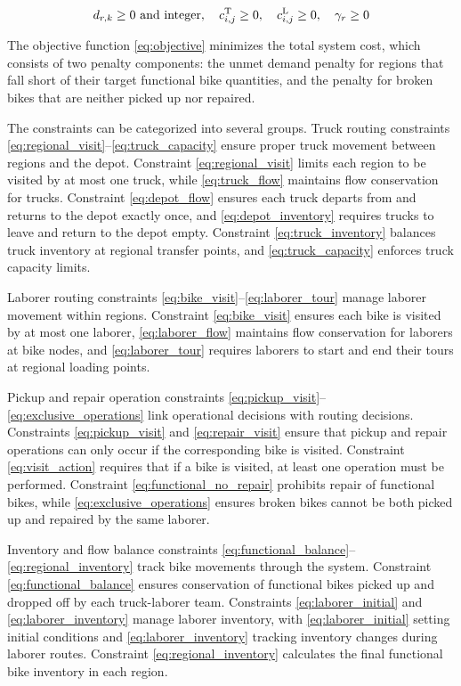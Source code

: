 \begin{linenomath}
    \begin{equation}
        d_{r,k} \geq 0 \text{ and integer}, \quad c_{i,j}^{\text{T}} \geq 0, \quad c_{i,j}^{\text{L}} \geq 0, \quad \gamma_r \geq 0 \label{eq:variable_domains}
    \end{equation}
\end{linenomath}

The objective function \eqref{eq:objective} minimizes the total system cost, which consists of two penalty components: the unmet demand penalty for regions that fall short of their target functional bike quantities, and the penalty for broken bikes that are neither picked up nor repaired.

The constraints can be categorized into several groups. Truck routing constraints \eqref{eq:regional_visit}--\eqref{eq:truck_capacity} ensure proper truck movement between regions and the depot. Constraint \eqref{eq:regional_visit} limits each region to be visited by at most one truck, while \eqref{eq:truck_flow} maintains flow conservation for trucks. Constraint \eqref{eq:depot_flow} ensures each truck departs from and returns to the depot exactly once, and \eqref{eq:depot_inventory} requires trucks to leave and return to the depot empty. Constraint \eqref{eq:truck_inventory} balances truck inventory at regional transfer points, and \eqref{eq:truck_capacity} enforces truck capacity limits.

Laborer routing constraints \eqref{eq:bike_visit}--\eqref{eq:laborer_tour} manage laborer movement within regions. Constraint \eqref{eq:bike_visit} ensures each bike is visited by at most one laborer, \eqref{eq:laborer_flow} maintains flow conservation for laborers at bike nodes, and \eqref{eq:laborer_tour} requires laborers to start and end their tours at regional loading points.

Pickup and repair operation constraints \eqref{eq:pickup_visit}--\eqref{eq:exclusive_operations} link operational decisions with routing decisions. Constraints \eqref{eq:pickup_visit} and \eqref{eq:repair_visit} ensure that pickup and repair operations can only occur if the corresponding bike is visited. Constraint \eqref{eq:visit_action} requires that if a bike is visited, at least one operation must be performed. Constraint \eqref{eq:functional_no_repair} prohibits repair of functional bikes, while \eqref{eq:exclusive_operations} ensures broken bikes cannot be both picked up and repaired by the same laborer.

Inventory and flow balance constraints \eqref{eq:functional_balance}--\eqref{eq:regional_inventory} track bike movements through the system. Constraint \eqref{eq:functional_balance} ensures conservation of functional bikes picked up and dropped off by each truck-laborer team. Constraints \eqref{eq:laborer_initial} and \eqref{eq:laborer_inventory} manage laborer inventory, with \eqref{eq:laborer_initial} setting initial conditions and \eqref{eq:laborer_inventory} tracking inventory changes during laborer routes. Constraint \eqref{eq:regional_inventory} calculates the final functional bike inventory in each region.

